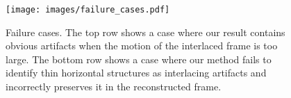 \fi
\begin{figure}[!tp]
	\centering
	\texttt{[image: images/failure\_cases.pdf]}\\
	\caption{Failure cases. The top row shows a case where our result contains obvious artifacts when the motion of the interlaced frame is too large. The bottom row shows a case where our method fails to identify thin horizontal structures as interlacing artifacts and incorrectly preserves it in the reconstructed frame.}\label{fig:failure_cases}
\end{figure}